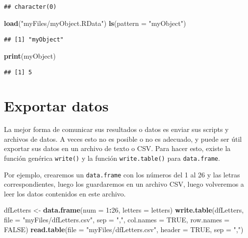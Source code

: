 \documentclass[
]{book}
\newenvironment{Shaded}{\begin{snugshade}}{\end{snugshade}}
\newcommand{\DataTypeTok}[1]{\textcolor[rgb]{0.13,0.29,0.53}{#1}}
\newcommand{\DecValTok}[1]{\textcolor[rgb]{0.00,0.00,0.81}{#1}}
\newcommand{\KeywordTok}[1]{\textcolor[rgb]{0.13,0.29,0.53}{\textbf{#1}}}
\newcommand{\NormalTok}[1]{#1}
\newcommand{\OperatorTok}[1]{\textcolor[rgb]{0.81,0.36,0.00}{\textbf{#1}}}
\newcommand{\OtherTok}[1]{\textcolor[rgb]{0.56,0.35,0.01}{#1}}
\newcommand{\StringTok}[1]{\textcolor[rgb]{0.31,0.60,0.02}{#1}}
\begin{document}
\begin{verbatim}
## character(0)
\end{verbatim}

\begin{Shaded}
\begin{Highlighting}[]
\KeywordTok{load}\NormalTok{(}\StringTok{"myFiles/myObject.RData"}\NormalTok{)}
\KeywordTok{ls}\NormalTok{(}\DataTypeTok{pattern =} \StringTok{"myObject"}\NormalTok{)}
\end{Highlighting}
\end{Shaded}

\begin{verbatim}
## [1] "myObject"
\end{verbatim}

\begin{Shaded}
\begin{Highlighting}[]
\KeywordTok{print}\NormalTok{(myObject)}
\end{Highlighting}
\end{Shaded}

\begin{verbatim}
## [1] 5
\end{verbatim}

\hypertarget{l016write}{%
\section{Exportar datos}\label{l016write}}

La mejor forma de comunicar sus resultados o datos es enviar sus scripts y archivos de datos. A veces esto no es posible o no es adecuado, y puede ser útil exportar sus datos en un archivo de texto o CSV. Para hacer esto, existe la función genérica \texttt{write()} y la función \texttt{write.table()} para \texttt{data.frame}.

Por ejemplo, crearemos un \texttt{data.frame} con los números del 1 al 26 y las letras correspondientes, luego los guardaremos en un archivo CSV, luego volveremos a leer los datos contenidos en este archivo.

\begin{Shaded}
\begin{Highlighting}[]
\NormalTok{dfLetters <-}\StringTok{ }\KeywordTok{data.frame}\NormalTok{(}\DataTypeTok{num =} \DecValTok{1}\OperatorTok{:}\DecValTok{26}\NormalTok{, }\DataTypeTok{letters =}\NormalTok{ letters)}
\KeywordTok{write.table}\NormalTok{(dfLetters, }\DataTypeTok{file =} \StringTok{"myFiles/dfLetters.csv"}\NormalTok{, }
  \DataTypeTok{sep =} \StringTok{","}\NormalTok{, }\DataTypeTok{col.names =} \OtherTok{TRUE}\NormalTok{, }\DataTypeTok{row.names =} \OtherTok{FALSE}\NormalTok{)}
\KeywordTok{read.table}\NormalTok{(}\DataTypeTok{file =} \StringTok{"myFiles/dfLetters.csv"}\NormalTok{, }\DataTypeTok{header =} \OtherTok{TRUE}\NormalTok{, }\DataTypeTok{sep =} \StringTok{","}\NormalTok{)}
\end{Highlighting}
\end{Shaded}
\end{document}
